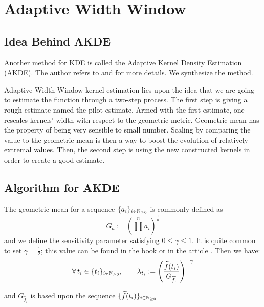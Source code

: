 \documentclass[11pt]{book}
\newcommand{\sequence}[1]{\{ #1 \}_{ i \in \N} }
\begin{document}
\section{Adaptive Width Window}
\subsection{Idea Behind AKDE}
Another method for KDE is called the Adaptive Kernel Density Estimation (AKDE). The author refers to \cite{Methods_ESTIM} and \cite{AKDE_ex} for more details. We synthesize the method.


Adaptive Width Window kernel estimation lies upon the idea that we are going to estimate the function through a two-step process. The first step is giving a rough estimate named the pilot estimate. Armed with the first estimate, one rescales kernels' width with respect to the geometric metric. Geometric mean has the property of being very sensible to small number. Scaling by comparing the value to the geometric mean is then a way to boost the evolution of relatively extremal values. 
Then, the second step is using the new constructed kernels in order to create a good estimate.



\subsection{Algorithm for AKDE}
\label{section:algo_awke}
The geometric mean for a sequence $\sequence{ a_i } $ is commonly defined as $$ G_{a} := \left (  \prod^n a_i \right  )^{\frac 1 n }$$ and we define the sensitivity parameter satisfying $ 0 \leq \gamma \leq 1$. It is quite common to set $\gamma = \frac 1 2$; this value can be found in the book \cite{Silverman} or in the article \cite{abramson}. Then we have:
\begin{equation}
\label{eq:local_width_factor}
\forall t_i \in \sequence{t_i}, \qquad \lambda_{t_i} :=  \left ( \frac{\widetilde{f}(t_i) }{G_{\widetilde{f_i}} } \right ) ^{ - \gamma }  
\end{equation}

and  $ G_{\widetilde{f_i}} $ is based upon the sequence $ \sequence{ \widetilde{f}(t_i) } $
\end{document}

